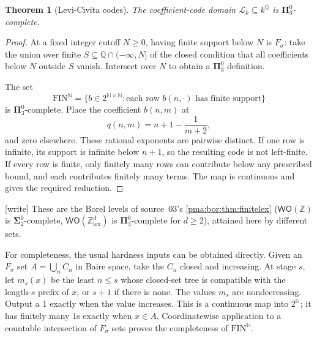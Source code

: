\documentclass[11pt]{article}
\numberwithin{equation}{section}
\newtheorem{theorem}{Theorem}[section]
\theoremstyle{definition}
\theoremstyle{remark}
\newcommand{\N}{\mathbb N}
\newcommand{\Z}{\mathbb Z}
\newcommand{\Q}{\mathbb Q}
\newcommand{\WO}{\mathsf{WO}}
\newcommand{\writetag}{\textup{\textsf{\small[write]}}}
\newcommand{\FIN}{\mathrm{FIN}}
\newcommand{\Lk}{\mathcal L_k}
\newcommand{\Pt}{\boldsymbol{\Pi}^{0}_{3}}
\begin{document}
\begin{theorem}[Levi-Civita codes]\label{pma:ser:thm:lcodes}
The coefficient-code domain $\Lk\subseteq k^\Q$ is $\Pt$-complete.
\end{theorem}
\begin{proof}
At a fixed integer cutoff $N\geq0$, having finite support below $N$ is
$F_\sigma$: take the union over finite $S\subseteq\Q\cap(-\infty,N]$ of
the closed condition that all coefficients below $N$ outside $S$ vanish.
Intersect over $N$ to obtain a $\Pt$ definition.

The set
\[
 \FIN^\N=\{b\in2^{\N\times\N}:
             \text{each row }b(n,\cdot)\text{ has finite support}\}
\]
is $\Pt$-complete. Place the coefficient $b(n,m)$ at
\begin{equation}\label{pma:ser:eq:rowcode}
 q(n,m)=n+1-\frac1{m+2},
\end{equation}
and zero elsewhere. These rational exponents are pairwise distinct.
If one row is infinite, its support is infinite below $n+1$, so the resulting
code is not left-finite. If every row is finite, only finitely many rows can
contribute below any prescribed bound, and each contributes finitely many
terms. The map is continuous and gives the required reduction.
\end{proof}

\noindent\writetag{} These are the Borel levels of source~03's
\cref{pma:bor:thm:finitelex} ($\WO(\Z)$ is $\boldsymbol\Sigma^0_2$-complete,
$\WO(\Z^d_{\mathrm{lex}})$ is $\boldsymbol\Pi^0_3$-complete for $d\ge2$),
attained here by different sets.

For completeness, the usual hardness inputs can be obtained directly.
Given an $F_\sigma$ set $A=\bigcup_n C_n$ in Baire space, take the $C_n$
closed and increasing. At stage $s$, let $m_s(x)$ be the least $n\leq s$
whose closed-set tree is compatible with the length-$s$ prefix of $x$, or
$s+1$ if there is none. The values $m_s$ are nondecreasing. Output a $1$
exactly when the value increases. This is a continuous map into $2^\N$;
it has finitely many $1$s exactly when $x\in A$. Coordinatewise application
to a countable intersection of $F_\sigma$ sets proves the completeness of
$\FIN^\N$.
\end{document}
